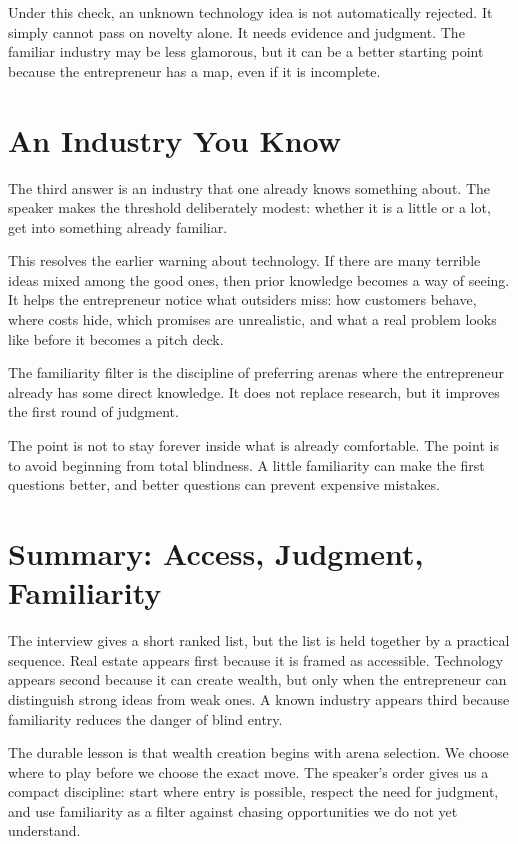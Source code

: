 Under this check, an unknown technology idea is not automatically rejected. It simply cannot pass on novelty alone. It needs evidence and judgment. The familiar industry may be less glamorous, but it can be a better starting point because the entrepreneur has a map, even if it is incomplete.

\section{An Industry You Know}

The third answer is an industry that one already knows something about. The speaker makes the threshold deliberately modest: whether it is a little or a lot, get into something already familiar.

This resolves the earlier warning about technology. If there are many terrible ideas mixed among the good ones, then prior knowledge becomes a way of seeing. It helps the entrepreneur notice what outsiders miss: how customers behave, where costs hide, which promises are unrealistic, and what a real problem looks like before it becomes a pitch deck.

\begin{definition}
The familiarity filter is the discipline of preferring arenas where the entrepreneur already has some direct knowledge. It does not replace research, but it improves the first round of judgment.
\end{definition}

The point is not to stay forever inside what is already comfortable. The point is to avoid beginning from total blindness. A little familiarity can make the first questions better, and better questions can prevent expensive mistakes.

\section{Summary: Access, Judgment, Familiarity}

The interview gives a short ranked list, but the list is held together by a practical sequence. Real estate appears first because it is framed as accessible. Technology appears second because it can create wealth, but only when the entrepreneur can distinguish strong ideas from weak ones. A known industry appears third because familiarity reduces the danger of blind entry.

The durable lesson is that wealth creation begins with arena selection. We choose where to play before we choose the exact move. The speaker's order gives us a compact discipline: start where entry is possible, respect the need for judgment, and use familiarity as a filter against chasing opportunities we do not yet understand.
